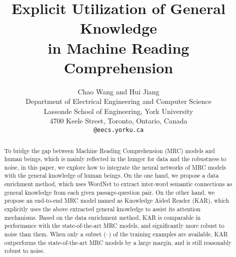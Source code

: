 \documentclass[11pt,a4paper]{article}
\title{Explicit Utilization of General Knowledge \\ in Machine Reading Comprehension}
\author{
Chao Wang and Hui Jiang \\
Department of Electrical Engineering and Computer Science \\
Lassonde School of Engineering, York University \\
4700 Keele Street, Toronto, Ontario, Canada \\
{\tt @eecs.yorku.ca}
}
\date{}
\begin{document}
\maketitle
\begin{abstract}
To bridge the gap between Machine Reading Comprehension (MRC) models and human beings, which is mainly reflected in the hunger for data and the robustness to noise, in this paper, we explore how to integrate the neural networks of MRC models with the general knowledge of human beings. On the one hand, we propose a data enrichment method, which uses WordNet to extract inter-word semantic connections as general knowledge from each given passage-question pair. On the other hand, we propose an end-to-end MRC model named as Knowledge Aided Reader (KAR), which explicitly uses the above extracted general knowledge to assist its attention mechanisms. Based on the data enrichment method, KAR is comparable in performance with the state-of-the-art MRC models, and significantly more robust to noise than them. When only a subset (--) of the training examples are available, KAR outperforms the state-of-the-art MRC models by a large margin, and is still reasonably robust to noise.
\end{abstract}
\end{document}
